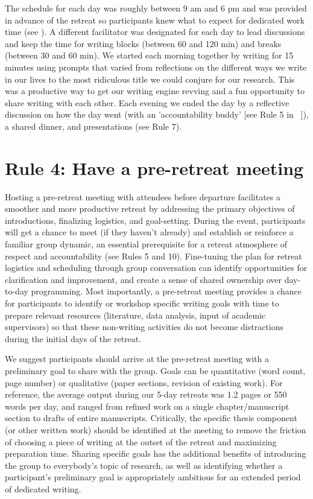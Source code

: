 \documentclass[10pt,letterpaper]{article}
\begin{document}
The schedule for each day was roughly between 9 am and 6 pm and was provided in advance of the retreat so participants knew what to expect for dedicated work time (see ). A different facilitator was designated for each day to lead discussions and keep the time for writing blocks (between 60 and 120 min) and breaks (between 30 and 60 min). We started each morning together by writing for 15 minutes using prompts that varied from reflections on the different ways we write in our lives to the most ridiculous title we could conjure for our research. This was a productive way to get our writing engine revving and a fun opportunity to share writing with each other. Each evening we ended the day by a reflective discussion on how the day went (with an 'accountability buddy' [see Rule 5 in ~\cite{peterson2018}]), a shared dinner, and presentations (see Rule 7).

\section*{Rule 4: Have a pre-retreat meeting}

Hosting a pre-retreat meeting with attendees before departure facilitates a smoother and more productive retreat by addressing the primary objectives of introductions, finalizing logistics, and goal-setting. During the event, participants will get a chance to meet (if they haven't already) and establish or reinforce a familiar group dynamic, an essential prerequisite for a retreat atmosphere of respect and accountability (see Rules 5 and 10). Fine-tuning the plan for retreat logistics and scheduling through group conversation can identify opportunities for clarification and improvement, and create a sense of shared ownership over day-to-day programming. Most importantly, a pre-retreat meeting provides a chance for participants to identify or workshop specific writing goals with time to prepare relevant resources (literature, data analysis, input of academic supervisors) so that these non-writing activities do not become distractions during the initial days of the retreat.

We suggest participants should arrive at the pre-retreat meeting with a preliminary goal to share with the group. Goals can be quantitative (word count, page number) or qualitative (paper sections, revision of existing work). For reference, the average output during our 5-day retreats was 1.2 pages or 550 words per day, and ranged from refined work on a single chapter/manuscript section to drafts of entire manuscripts. Critically, the specific thesis component (or other written work) should be identified at the meeting to remove the friction of choosing a piece of writing at the outset of the retreat and maximizing preparation time. Sharing specific goals has the additional benefits of introducing the group to everybody's topic of research, as well as identifying whether a participant's preliminary goal is appropriately ambitious for an extended period of dedicated writing.
\end{document}
